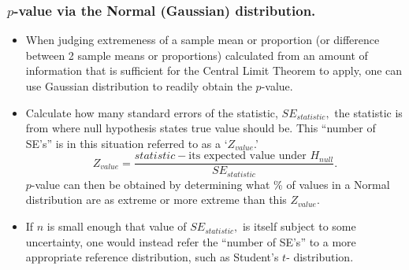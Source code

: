 \documentclass[10pt]{beamer}\usepackage[]{graphicx}\usepackage[]{color}
\begin{document}
\begin{frame}
	\frametitle{$p$-value via the Normal (Gaussian) distribution.}
	
	\begin{footnotesize}
		\begin{itemize}
			\item When judging extremeness of a sample mean or proportion (or  difference between 2 sample means or proportions) calculated from an amount of information that is sufficient for the Central Limit Theorem to apply, one can use Gaussian distribution to readily obtain the $p$-value.
			\item Calculate how many standard errors of the statistic, $SE_{statistic},$ the statistic is from where null hypothesis states true value should be.  This ``number of SE's'' is in this situation referred to as a `$Z_{value}$.'
			$$Z_{value} = \frac{statistic -  \textrm{its expected value under } H_{null} }{SE_{statistic}}.$$
			$p$-value can then be obtained by determining what \% of values in a Normal distribution are as extreme or more extreme than this $Z_{value}.$
			\item
			If $n$ is small enough that value of $SE_{statistic},$ is itself subject to some 
			uncertainty, one would instead refer the ``number of SE's'' to a more appropriate reference distribution, such as Student's $t$- distribution.
		\end{itemize}
		
	\end{footnotesize}
\end{frame}
\end{document}
